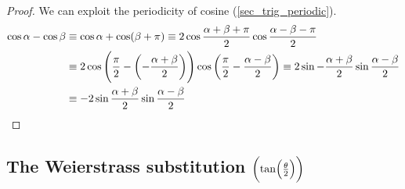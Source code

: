 \documentclass[fleqn,a4paper,11pt]{article}
\begin{document}
    \begin{proof}
    We can exploit the periodicity of cosine (\ref{sec_trig_periodic}).
    \begin{align*}
     \cos \alpha - \cos \beta &\equiv
     \cos \alpha + \cos (\beta + \pi)  \equiv
     2 \cos \frac{\alpha + \beta + \pi} 2 \cos \frac {\alpha - \beta - \pi} 2
     \\&\equiv
     2 \cos \pqty{\frac \pi 2 - \pqty{-\frac{\alpha + \beta} 2}}
       \cos \pqty{\frac \pi 2 - \frac{\alpha - \beta} 2} \equiv
     2 \sin -\frac{\alpha + \beta} 2 \sin \frac{\alpha - \beta} 2 \\&\equiv
     -2 \sin \frac{\alpha + \beta} 2 \sin \frac{\alpha - \beta} 2
    \end{align*}
    \end{proof}

    \subsection[The Weierstrass substitution (\(\tan(\theta / 2)\))]
       {The Weierstrass substitution \boldmath\(\pqty{\tan(\frac \theta 2)}\)}
\end{document}
